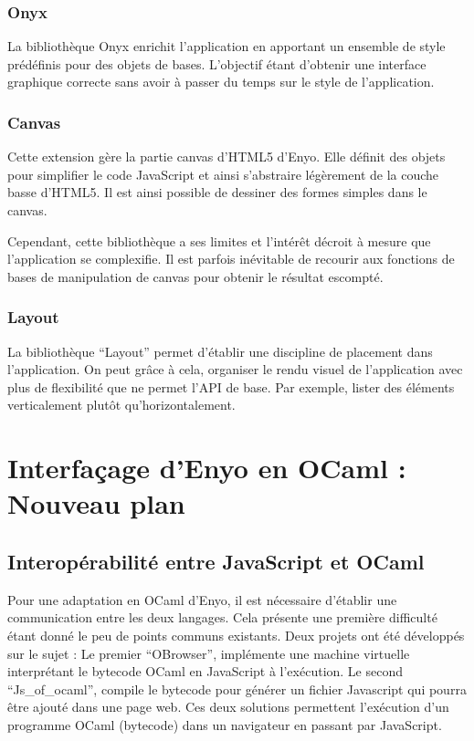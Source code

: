 \documentclass[11pt,a4paper]{report}
\begin{document}
\subsection{Onyx}

La bibliothèque Onyx enrichit l'application en apportant un ensemble de style prédéfinis pour 
des objets de bases. L'objectif étant d'obtenir une interface graphique correcte sans avoir
à passer du temps sur le style de l'application.

\subsection{Canvas}

Cette extension gère la partie canvas d'HTML5 d'Enyo. Elle définit des objets pour simplifier 
le code JavaScript et ainsi s'abstraire légèrement de la couche basse d'HTML5. Il est ainsi
possible de dessiner des formes simples dans le canvas.

Cependant, cette bibliothèque a ses limites et l'intérêt décroit à mesure que l'application se complexifie.
Il est parfois inévitable de recourir aux fonctions de bases de manipulation de canvas pour obtenir
le résultat escompté.

\subsection{Layout}

La bibliothèque ``Layout'' permet d'établir une discipline de placement dans l'application.
On peut grâce à cela, organiser le rendu visuel de l'application avec plus de flexibilité
que ne permet l'API de base. Par exemple, lister des éléments verticalement plutôt qu'horizontalement.

\chapter{Interfaçage d'Enyo en OCaml : Nouveau plan}\label{chap:model}

\section{Interopérabilité entre JavaScript et OCaml}

Pour une adaptation en OCaml d'Enyo, il est nécessaire d'établir une communication
entre les deux langages. Cela présente une première difficulté étant donné le peu
de points communs existants. Deux projets ont été développés sur le sujet : Le premier 
``OBrowser''\cite{pwt}, implémente une machine virtuelle interprétant le bytecode OCaml
en JavaScript à l'exécution. Le second ``Js\_of\_ocaml'', compile le bytecode pour générer
un fichier Javascript qui pourra être ajouté dans une page web. Ces deux solutions
permettent l'exécution d'un programme OCaml (bytecode) dans un navigateur en passant par JavaScript. 
\end{document}
